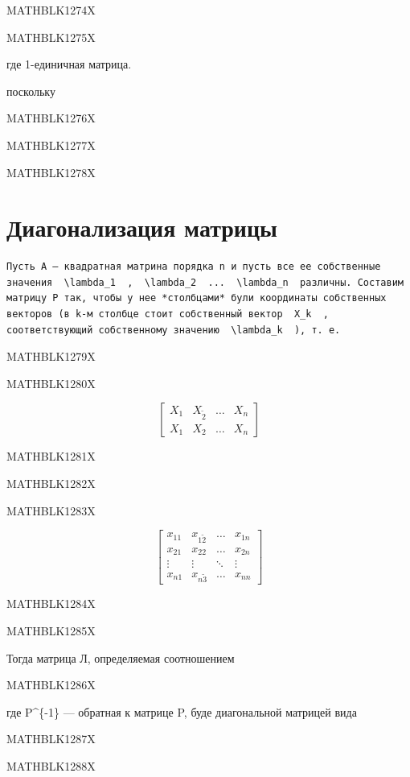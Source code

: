 \documentclass[
  ukrainian,
]{article}
\begin{document}
MATHBLK1274X

MATHBLK1275X

где 1-единичная матрица.

поскольку

MATHBLK1276X

MATHBLK1277X

MATHBLK1278X

\section{Диагонализация
матрицы}\label{ux434ux438ux430ux433ux43eux43dux430ux43bux438ux437ux430ux446ux438ux44f-ux43cux430ux442ux440ux438ux446ux44b}

\begin{verbatim}
Пусть A — квадратная матрина порядка n и пусть все ее собственные значения  \lambda_1  ,  \lambda_2  ...  \lambda_n  различны. Составим матрицу P так, чтобы у нее *столбцами* були координаты собственных векторов (в k-м столбце стоит собственный вектор  X_k  , соответствующий собственному значению  \lambda_k  ), т. е.
\end{verbatim}

MATHBLK1279X

MATHBLK1280X

\[
\begin{bmatrix} X_1 & X_{\tilde{2}} & \dots & X_n \\ X_{1} & X_{2} & \dots & X_n \end{bmatrix}
\]

MATHBLK1281X

MATHBLK1282X

MATHBLK1283X

\[
\begin{bmatrix} x_{11} & x_{1\tilde{2}} & \dots & x_{1n} \\ x_{21} & x_{22} & \dots & x_{2n} \\ \vdots & \vdots & \ddots & \vdots \\ x_{n1} & x_{n\tilde{3}} & \dots & x_{nn} \end{bmatrix}
\]

MATHBLK1284X

MATHBLK1285X

Тогда матрица Л, определяемая соотношением

MATHBLK1286X

где P\^{}\{-1\} --- обратная к матрице P, буде диагональной матрицей
вида

MATHBLK1287X

MATHBLK1288X
\end{document}
